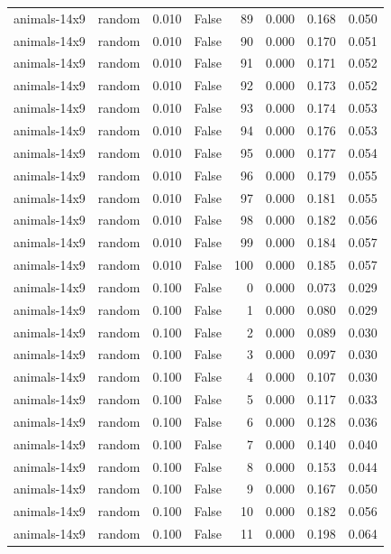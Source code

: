 \begin{tabular}{llrrrrrr}
animals-14x9 & random & 0.010 & False & 89 & 0.000 & 0.168 & 0.050 \\
animals-14x9 & random & 0.010 & False & 90 & 0.000 & 0.170 & 0.051 \\
animals-14x9 & random & 0.010 & False & 91 & 0.000 & 0.171 & 0.052 \\
animals-14x9 & random & 0.010 & False & 92 & 0.000 & 0.173 & 0.052 \\
animals-14x9 & random & 0.010 & False & 93 & 0.000 & 0.174 & 0.053 \\
animals-14x9 & random & 0.010 & False & 94 & 0.000 & 0.176 & 0.053 \\
animals-14x9 & random & 0.010 & False & 95 & 0.000 & 0.177 & 0.054 \\
animals-14x9 & random & 0.010 & False & 96 & 0.000 & 0.179 & 0.055 \\
animals-14x9 & random & 0.010 & False & 97 & 0.000 & 0.181 & 0.055 \\
animals-14x9 & random & 0.010 & False & 98 & 0.000 & 0.182 & 0.056 \\
animals-14x9 & random & 0.010 & False & 99 & 0.000 & 0.184 & 0.057 \\
animals-14x9 & random & 0.010 & False & 100 & 0.000 & 0.185 & 0.057 \\
animals-14x9 & random & 0.100 & False & 0 & 0.000 & 0.073 & 0.029 \\
animals-14x9 & random & 0.100 & False & 1 & 0.000 & 0.080 & 0.029 \\
animals-14x9 & random & 0.100 & False & 2 & 0.000 & 0.089 & 0.030 \\
animals-14x9 & random & 0.100 & False & 3 & 0.000 & 0.097 & 0.030 \\
animals-14x9 & random & 0.100 & False & 4 & 0.000 & 0.107 & 0.030 \\
animals-14x9 & random & 0.100 & False & 5 & 0.000 & 0.117 & 0.033 \\
animals-14x9 & random & 0.100 & False & 6 & 0.000 & 0.128 & 0.036 \\
animals-14x9 & random & 0.100 & False & 7 & 0.000 & 0.140 & 0.040 \\
animals-14x9 & random & 0.100 & False & 8 & 0.000 & 0.153 & 0.044 \\
animals-14x9 & random & 0.100 & False & 9 & 0.000 & 0.167 & 0.050 \\
animals-14x9 & random & 0.100 & False & 10 & 0.000 & 0.182 & 0.056 \\
animals-14x9 & random & 0.100 & False & 11 & 0.000 & 0.198 & 0.064 \\

\end{tabular}
